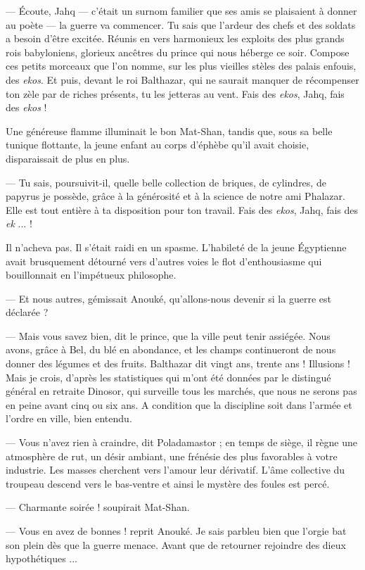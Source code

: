 \documentclass[a4paper, 11pt, oneside, polutonikogreek, french]{article}
\begin{document}
--- Écoute, Jahq --- c'était un surnom familier que ses amis se plaisaient à donner au poète --- la guerre va commencer. Tu sais que l'ardeur des chefs et des soldats a besoin d'être excitée. Réunis en vers harmonieux les exploits des plus grands rois babyloniens, glorieux ancêtres du prince qui nous héberge ce soir. Compose ces petits morceaux que l'on nomme, sur les plus vieilles stèles des palais enfouis, des \emph{ekos}. Et puis, devant le roi Balthazar, qui ne saurait manquer de récompenser ton zèle par de riches présents, tu les jetteras au vent. Fais des \emph{ekos}, Jahq, fais des \emph{ekos} !

Une généreuse flamme illuminait le bon Mat-Shan, tandis que, sous sa belle tunique flottante, la jeune enfant au corps d'éphèbe qu'il avait choisie, disparaissait de plus en plus.

--- Tu sais, poursuivit-il, quelle belle collection de briques, de cylindres, de papyrus je possède, grâce à la générosité et à la science de notre ami Phalazar. Elle est tout entière à ta disposition pour ton travail. Fais des \emph{ekos}, Jahq, fais des \emph{ek} ... !

Il n'acheva pas. Il s'était raidi en un spasme. L'habileté de la jeune Égyptienne avait brusquement détourné vers d'autres voies le flot d'enthousiasme qui bouillonnait en l'impétueux philosophe.

--- Et nous autres, gémissait Anouké, qu'allons-nous devenir si la guerre est déclarée ?

--- Mais vous savez bien, dit le prince, que la ville peut tenir assiégée. Nous avons, grâce à Bel, du blé en abondance, et les champs continueront de nous donner des légumes et des fruits. Balthazar dit vingt ans, trente ans ! Illusions ! Mais je crois, d'après les statistiques qui m'ont été données par le distingué général en retraite Dinosor, qui surveille tous les marchés, que nous ne serons pas en peine avant cinq ou six ans. A condition que la discipline soit dans l'armée et l'ordre en ville, bien entendu.

--- Vous n'avez rien à craindre, dit Poladamastor ; en temps de siège, il règne une atmosphère de rut, un désir ambiant, une frénésie des plus favorables à votre industrie. Les masses cherchent vers l'amour leur dérivatif. L'âme collective du troupeau descend vers le bas-ventre et ainsi le mystère des foules est percé.

--- Charmante soirée ! soupirait Mat-Shan.

--- Vous en avez de bonnes ! reprit Anouké. Je sais parbleu bien que l'orgie bat son plein dès que la guerre menace. Avant que de retourner rejoindre des dieux hypothétiques ...
\end{document}
